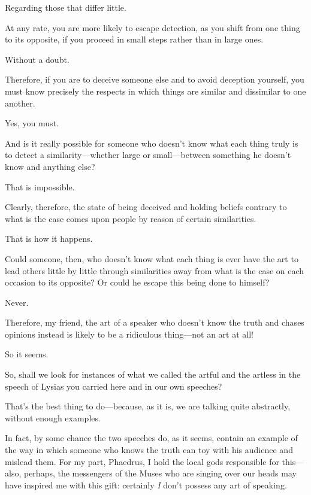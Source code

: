 \sayphaedrus Regarding those that differ little.

\saysocrates At any rate, you are more likely to escape detection, as you
shift from one thing to its opposite, if you proceed in small steps
rather than in large ones.

\sayphaedrus Without a doubt.

\saysocrates Therefore, if you are to deceive someone else and to avoid
deception yourself, you must know precisely the respects in which things
are similar and dissimilar to one another.

\sayphaedrus Yes, you must.

\saysocrates And is it really possible for someone who doesn't know what
each thing truly is to detect a similarity---whether large or
small---between something he doesn't know and anything else?

\sayphaedrus That is impossible.

\saysocrates Clearly, therefore, the state of being deceived and holding
beliefs contrary to what is the case comes upon people by reason of
certain similarities.

\sayphaedrus That is how it happens.

\saysocrates Could someone, then, who doesn't know what each thing is ever
have the art to lead others little by little through similarities away
from what is the case on each occasion to its opposite? Or could he
escape this being done to himself?

\sayphaedrus Never.

\saysocrates Therefore, my friend, the art of a speaker who doesn't know 
the truth and chases opinions instead is likely to be a
ridiculous thing---not an art at all!

\sayphaedrus So it seems.

\saysocrates So, shall we look for instances of what we called the artful
and the artless in the speech of Lysias you carried here and in our own
speeches?

\sayphaedrus That's the best thing to do---because, as it is, we are
talking quite abstractly, without enough examples.

\saysocrates In fact, by some chance the two speeches do, as it seems,
contain an example of the way in which someone who knows the truth 
can toy with his audience and mislead them. For my part,
Phaedrus, I hold the local gods responsible for this---also, perhaps,
the messengers of the Muses who are singing over our heads may have
inspired me with this gift: certainly {\em I} don't possess any art of
speaking.

